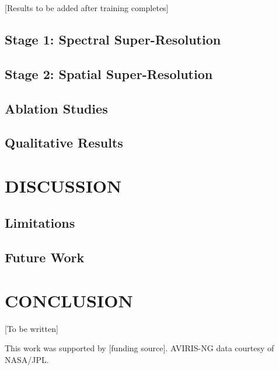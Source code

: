 \documentclass[]{spieman}
\begin{document}
[Results to be added after training completes]

\subsection{Stage 1: Spectral Super-Resolution}

\subsection{Stage 2: Spatial Super-Resolution}

\subsection{Ablation Studies}

\subsection{Qualitative Results}

\section{DISCUSSION}
\label{sec:discussion}

\subsection{Limitations}

\subsection{Future Work}

\section{CONCLUSION}
\label{sec:conclusion}

[To be written]

\acknowledgments

This work was supported by [funding source]. AVIRIS-NG data courtesy of NASA/JPL.



\end{document}
